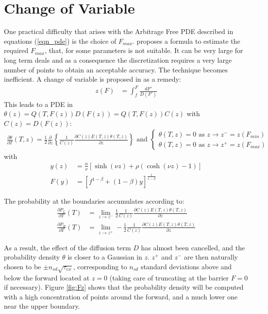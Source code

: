 \documentclass[]{rAMF2e}
\begin{document}
\section{Change of Variable}
One practical difficulty that arises with the Arbitrage Free PDE described in equations (\ref{eqn_pde}) is the choice of $F_{max}$. \citet{hagan2013arbitrage} proposes a formula to estimate the required $F_{max}$, that, for some parameters is not suitable. It can be very large for long term deals and as a consequence the discretization requires a very large number of points to obtain an acceptable accuracy. The technique becomes inefficient. A change of variable is proposed in \citep{hagan2013change} as a remedy:
\begin{align}
z(F) &= \int_{f}^F \frac{dF'}{D(F')}
\end{align}
This leads to a PDE in $\theta(z) = Q(T,F(z))D(F(z)) = Q(T,F(z))C(z)$ with $C(z) = D(F(z))$:
\begin{align}\label{eqn-transform-pde}
\frac{\partial \theta}{\partial T}(T,z) = \frac{1}{2} \frac{\partial}{\partial z} \left\lbrace \frac{1}{C(z)} \frac{\partial C(z)E(T,z)\theta(T,z)}{\partial z} \right\rbrace
 \text{ and } \begin{cases}
\theta(T,z) = 0 \text{ as } z \to z^{-}=z(F_{min})\\
\theta(T,z) = 0 \text{ as } z \to z^{+}=z(F_{max})
\end{cases}
\end{align}
with \begin{align}
y(z) &= \frac{\alpha}{\nu}\left[ \sinh(\nu z) + \rho (\cosh(\nu z) - 1) \right]\\
F(y) &= \left[ f^{1-\beta} + (1-\beta)y \right]^{\frac{1}{1-\beta}}
\end{align}

The probability at the boundaries accumulates according to:
\begin{align}\label{eqn-transform-boundary}
\frac{\partial P_L}{\partial T}(T) &= \lim_{z \to z^{-}} \frac{1}{2} \frac{1}{C(z)} \frac{\partial C(z)E(T,z)\theta(T,z)}{\partial z}\\
\frac{\partial P_R}{\partial T}(T) &= \lim_{z \to z^{+}}  -\frac{1}{2} \frac{1}{C(z)} \frac{\partial C(z)E(T,z)\theta(T,z)}{\partial z}
\end{align}

As a result, the effect of the diffusion term $D$ has almost been cancelled, and the probability density $\theta$ is closer to a Gaussian in $z$. $z^+$ and $z^-$ are then naturally chosen to be $\pm n_{sd}\sqrt{\tau_{ex}}$, corresponding to $n_{sd}$ standard deviations above and below the forward located at $z=0$ (taking care of truncating at the barrier $F=0$ if necessary). Figure \ref{fig:Fz} shows that the probability density will be computed with a high concentration of points around the forward, and a much lower one near the upper boundary.
\end{document}
